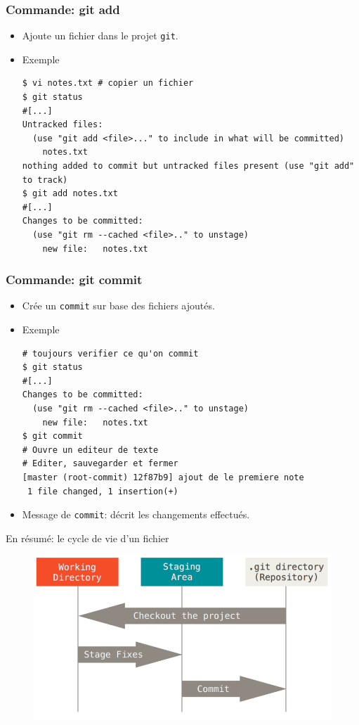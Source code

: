 \documentclass{beamer}
\begin{document}
\begin{frame}[fragile]
\frametitle{Commande: git add}
\begin{itemize}
    \item Ajoute un fichier dans le projet \texttt{git}.
    \item Exemple
\begin{lstlisting}
$ vi notes.txt # copier un fichier
$ git status
#[...]
Untracked files:
  (use "git add <file>..." to include in what will be committed)
	notes.txt
nothing added to commit but untracked files present (use "git add" to track)
$ git add notes.txt
#[...]
Changes to be committed:
  (use "git rm --cached <file>.." to unstage)
	new file:   notes.txt
\end{lstlisting}
\end{itemize}
\end{frame}

\begin{frame}[fragile]
\frametitle{Commande: git commit}
\begin{itemize}
    \item Crée un \texttt{commit} sur base des fichiers ajoutés.
    \item Exemple
\begin{lstlisting}
# toujours verifier ce qu'on commit
$ git status
#[...]
Changes to be committed:
  (use "git rm --cached <file>.." to unstage)
	new file:   notes.txt
$ git commit
# Ouvre un editeur de texte
# Editer, sauvegarder et fermer
[master (root-commit) 12f87b9] ajout de le premiere note
 1 file changed, 1 insertion(+)
\end{lstlisting}
\item Message de \texttt{commit}: décrit les changements effectués.
\end{itemize}
\end{frame}

\begin{frame}{En résumé: le cycle de vie d'un fichier}
\begin{figure}
    \centering
    \includegraphics[width=\textwidth]{img/areas.png}
\end{figure}
\end{frame}
\end{document}
